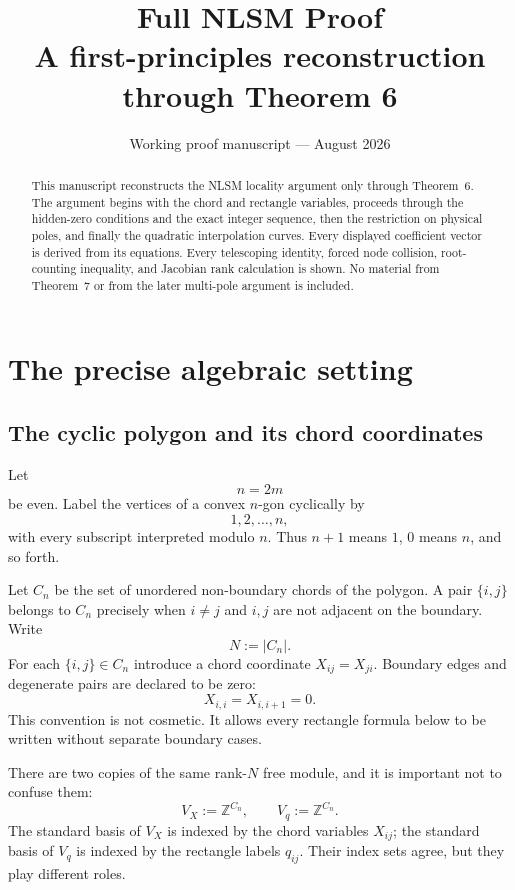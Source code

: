 \documentclass[11pt]{article}
\title{\textbf{Full NLSM Proof}\\[0.4em]
\large A first-principles reconstruction through Theorem 6}
\author{}
\date{Working proof manuscript --- August 2026}
\theoremstyle{definition}
\newcommand{\Z}{\mathbb Z}
\begin{document}
\maketitle

\begin{abstract}
This manuscript reconstructs the NLSM locality argument only through Theorem~6.
The argument begins with the chord and rectangle variables, proceeds through
the hidden-zero conditions and the exact
integer sequence, then the restriction on physical poles, and finally the
quadratic interpolation curves.  Every displayed coefficient vector is
derived from its equations.  Every telescoping identity, forced node
collision, root-counting inequality, and Jacobian rank calculation is shown.
No material from Theorem~7 or from the later multi-pole argument is included.
\end{abstract}

\tableofcontents
\newpage

\section{The precise algebraic setting}

\subsection{The cyclic polygon and its chord coordinates}

Let
\[
n=2m
\]
be even.  Label the vertices of a convex $n$-gon cyclically by
\[
1,2,\ldots,n,
\]
with every subscript interpreted modulo $n$.  Thus $n+1$ means $1$, $0$ means $n$, and so forth.

Let $C_n$ be the set of unordered non-boundary chords of the polygon.  A pair $\{i,j\}$ belongs to $C_n$ precisely when $i\neq j$ and $i,j$ are not adjacent on the boundary.  Write
\[
N:=|C_n|.
\]
For each $\{i,j\}\in C_n$ introduce a chord coordinate $X_{ij}=X_{ji}$.  Boundary edges and degenerate pairs are declared to be zero:
\[
X_{i,i}=X_{i,i+1}=0.
\]
This convention is not cosmetic.  It allows every rectangle formula below to be written without separate boundary cases.

There are two copies of the same rank-$N$ free module, and it is important not to confuse them:
\[
V_X:=\Z^{C_n},\qquad V_q:=\Z^{C_n}.
\]
The standard basis of $V_X$ is indexed by the chord variables $X_{ij}$; the standard basis of $V_q$ is indexed by the rectangle labels $q_{ij}$.  Their index sets agree, but they play different roles.
\end{document}
